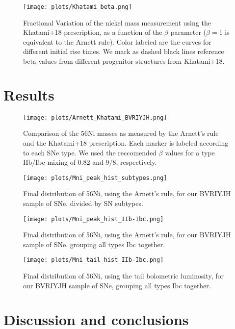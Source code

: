 \documentclass[onecolumn]{aa} %
\begin{document}
\begin{figure}[ht!]
 \centering
\texttt{[image: plots/Khatami\_beta.png]}
\caption{Fractional Variation of the nickel mass measurement using the Khatami+18 prescription, as a function of the $\beta$ parameter ($\beta=1$ is equivalent to the Arnett rule). Color labeled are the curves for different initial rise times. We mark as dashed black lines reference beta values from different progenitor structures from Khatami+18.\label{fig:khatami_shift}}
\end{figure}

\section{Results}

\begin{figure}[ht!]
 \centering
\texttt{[image: plots/Arnett\_Khatami\_BVRIYJH.png]}
\caption{Comparison of the 56Ni masses as measured by the Arnett's rule and the Khatami+18 prescription. Each marker is labeled according to each SNe type.  We used the reccomended $\beta$ values for a type IIb/Ibc mixing of 0.82 and $9/8$, respectively. \label{fig:Ni56_comp}}
\end{figure}

\begin{figure}[ht!]
 \centering
\texttt{[image: plots/Mni\_peak\_hist\_subtypes.png]}
\caption{Final distribution of 56Ni, using the Arnett's rule, for our BVRIYJH sample of SNe, divided by SN subtypes.\label{fig:hist_subtypes}}
\end{figure}

\begin{figure}[ht!]
 \centering
\texttt{[image: plots/Mni\_peak\_hist\_IIb-Ibc.png]}
\caption{Final distribution of 56Ni, using the Arnett's rule, for our BVRIYJH sample of SNe, grouping all types Ibc together. \label{fig:hist_all}}
\end{figure}

\begin{figure}[ht!]
 \centering
\texttt{[image: plots/Mni\_tail\_hist\_IIb-Ibc.png]}
\caption{Final distribution of 56Ni, using the tail bolometric luminosity, for our BVRIYJH sample of SNe, grouping all types Ibc together. \label{fig:hist_all}}
\end{figure}


\section{Discussion and conclusions}
\end{document}
